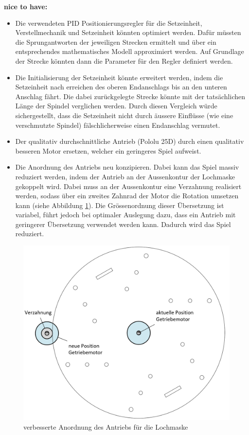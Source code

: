 \textbf{nice to have:}
\begin{itemize}
	\item Die verwendeten PID Positionierungsregler für die Setzeinheit, Verstellmechanik und Setzeinheit könnten optimiert werden. Dafür müssten die Sprungantworten der jeweiligen Strecken ermittelt und über ein entsprechendes mathematisches Modell approximiert werden. Auf Grundlage der Strecke könnten dann die Parameter für den Regler definiert werden.
	\item Die Initialisierung der Setzeinheit könnte erweitert werden, indem die Setzeinheit nach erreichen des oberen Endanschlags bis an den unteren Anschlag fährt. Die dabei zurückgelegte Strecke könnte mit der tatsächlichen Länge der Spindel verglichen werden. Durch diesen Vergleich würde sichergestellt, dass die Setzeinheit nicht durch äussere Einflüsse (wie eine verschmutzte Spindel) fälschlicherweise einen Endanschlag vermutet.
	\item Der qualitativ durchschnittliche Antrieb (Pololu 25D) durch einen qualitativ besseren Motor ersetzen, welcher ein geringeres Spiel aufweist.
	\item Die Anordnung des Antriebs neu konzipieren. Dabei kann das Spiel massiv reduziert werden, indem der Antrieb an der Aussenkontur der Lochmaske gekoppelt wird. Dabei muss an der Aussenkontur eine Verzahnung realisiert werden, sodass über ein zweites Zahnrad der Motor die Rotation umsetzen kann (siehe Abbildung \ref{fig:optimierung_lochmaske}). Die Grössenordnung dieser Übersetzung ist variabel, führt jedoch bei optimaler Auslegung dazu, dass ein Antrieb mit geringerer Übersetzung verwendet werden kann. Dadurch wird das Spiel reduziert. 
\end{itemize}

\begin{figure}[H]
	\includegraphics[draft=false,scale=0.4]{Illustrationen/8-Fazit/optimierung_lochmaske.png}
	\caption{verbesserte Anordnung des Antriebs für die Lochmaske}
	\label{fig:optimierung_lochmaske}
\end{figure}